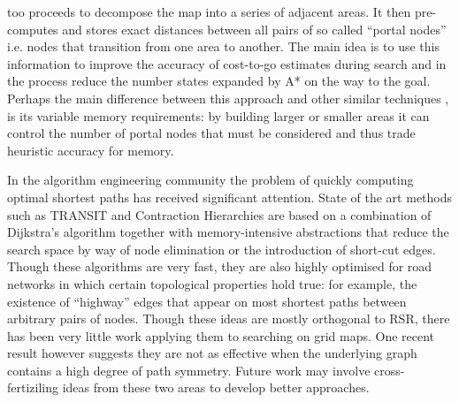 too proceeds to decompose the map into a series of adjacent areas.  It then
pre-computes and stores exact distances between all pairs of so called ``portal nodes''
i.e. nodes that transition from one area to another. The main idea is to
use this information to improve the accuracy of cost-to-go estimates during
search and in the process reduce the number states expanded by A* on the way to
the goal.  Perhaps the main difference between this approach and other similar
techniques \cite{sturtevant09,felner09,bjornsson09}, is its variable memory
requirements: by building larger or smaller areas it can control the number of
portal nodes that must be considered and thus trade heuristic accuracy for 
memory.
\par
In the algorithm engineering community the problem of quickly computing optimal
shortest paths has received significant attention.
State of the art methods such as TRANSIT \cite{bast06} and Contraction Hierarchies
\cite{geisberger08} are based
on a combination of Dijkstra's algorithm together with memory-intensive 
abstractions that reduce the search space by way of node elimination or the
introduction of short-cut edges.  Though these algorithms are very fast, they are
also highly optimised for road networks in which certain topological properties
hold true: for example, the existence of ``highway'' edges that appear on most
shortest paths between arbitrary pairs of nodes. Though these ideas are mostly
orthogonal to RSR, there has been very
little work applying them to searching on grid maps. One recent result
however \cite{sturtevant10} suggests they are not as effective when the underlying 
graph contains a high degree of path symmetry. Future work may involve 
cross-fertiziling ideas from these two areas to develop better approaches.

